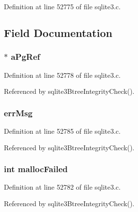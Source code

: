 Definition at line 52775 of file sqlite3.\+c.



\subsection{Field Documentation}
\hypertarget{struct_integrity_ck_aeddb58305f7868c35e8aa73c47eb408c}{}
\subsubsection[{a\+Pg\+Ref}]{$\ast$ a\+Pg\+Ref}\label{struct_integrity_ck_aeddb58305f7868c35e8aa73c47eb408c}


Definition at line 52778 of file sqlite3.\+c.



Referenced by sqlite3\+Btree\+Integrity\+Check().

\hypertarget{struct_integrity_ck_a6caf852b25fbc8f19a715f35ef7d0e97}{}
\subsubsection[{err\+Msg}]{ err\+Msg}\label{struct_integrity_ck_a6caf852b25fbc8f19a715f35ef7d0e97}


Definition at line 52785 of file sqlite3.\+c.



Referenced by sqlite3\+Btree\+Integrity\+Check().

\hypertarget{struct_integrity_ck_a7a8a4eba8ff82d59f2874505949b36f4}{}
\subsubsection[{malloc\+Failed}]{\setlength{\rightskip}{0pt plus 5cm}int malloc\+Failed}\label{struct_integrity_ck_a7a8a4eba8ff82d59f2874505949b36f4}


Definition at line 52782 of file sqlite3.\+c.



Referenced by sqlite3\+Btree\+Integrity\+Check().

